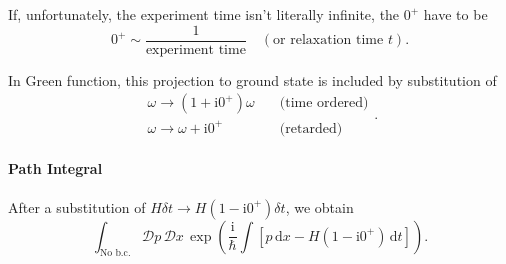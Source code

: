 If, unfortunately, the experiment time isn't literally infinite, the $0^{+}$ have to be
\begin{equation}
  0^{+} \sim \frac{1}{\text{experiment time}}\quad (\text{or relaxation time } t).
\end{equation}

In Green function, this projection to ground state is included by substitution of
\begin{equation}
   \begin{aligned}
     \omega \to \left( 1 + \mathrm{i} 0^{+} \right) \omega \quad &\text{(time ordered)}
     \\
     \omega \to \omega + \mathrm{i}  0^{+}\quad &\text{(retarded)}
   \end{aligned}.
\end{equation}

\paragraph{Path Integral}
After a substitution of $H \delta t \to H \left( 1-\mathrm{i}  0^{+} \right) \delta t$, we obtain
\begin{equation}
  \int_{\text{No b.c.}} \mathcal{D} p \, \mathcal{D} x \, \exp \left( \frac{\mathrm{i} }{\hbar} \int \left[ p\, \mathrm{d} x - H \left( 1-\mathrm{i} 0^{+} \right) \, \mathrm{d} t\right]  \right) .
\end{equation}

